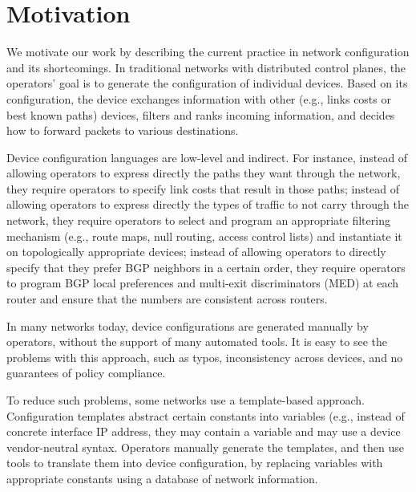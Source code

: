\section{Motivation}
\label{sec:motivation}

We motivate our work by describing the current practice in network configuration and its shortcomings.
In traditional networks with distributed control planes, the operators’ goal is to generate the configuration of individual devices. Based on its configuration, the device exchanges information with other (e.g., links costs or best known paths) devices, filters and ranks incoming information, and decides how to forward packets to various destinations.

Device configuration languages are low-level and indirect. For instance, instead of allowing operators to express directly the paths they want through the network, they require operators to specify link costs that result in those paths; instead of allowing operators to express directly the types of traffic to not carry through the network, they require operators to select and program an appropriate filtering mechanism (e.g., route maps, null routing,  access control lists) and instantiate it on topologically appropriate devices; instead of allowing operators to directly specify that they prefer BGP neighbors in a certain order, they require operators to program BGP local preferences and multi-exit discriminators (MED) at each router and ensure that the numbers are consistent across routers.

In many networks today, device configurations are generated manually by operators, without the support of many automated tools. It is easy to see the problems with this approach, such as typos, inconsistency across devices, and no guarantees of policy compliance.

To reduce such problems, some networks use a template-based approach. Configuration templates abstract certain constants into variables (e.g., instead of concrete interface IP address, they may contain a variable {\small {}} and may use a device vendor-neutral syntax. Operators manually generate the templates, and then use tools to translate them into device configuration, by replacing variables with appropriate constants using a database of network information.
 


